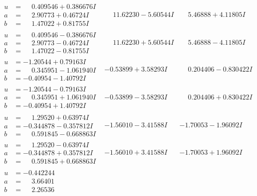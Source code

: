 \documentclass[1p]{elsarticle_modified}
\theoremstyle{definition}
\begin{document}
$$\begin{array}{c|c|c}
\begin{aligned}
u &= \phantom{-}0.409546 + 0.386676 I \\
a &= \phantom{-}2.90773 + 0.46724 I \\
b &= \phantom{-}1.47022 + 0.81755 I\end{aligned}
 & \phantom{-}11.62230 - 5.60544 I & \phantom{-}5.46888 + 4.11805 I \\ \hline\begin{aligned}
u &= \phantom{-}0.409546 - 0.386676 I \\
a &= \phantom{-}2.90773 - 0.46724 I \\
b &= \phantom{-}1.47022 - 0.81755 I\end{aligned}
 & \phantom{-}11.62230 + 5.60544 I & \phantom{-}5.46888 - 4.11805 I \\ \hline\begin{aligned}
u &= -1.20544 + 0.79163 I \\
a &= \phantom{-}0.345951 - 1.061940 I \\
b &= -0.40954 - 1.40792 I\end{aligned}
 & -0.53899 + 3.58293 I & \phantom{-}0.204406 - 0.830422 I \\ \hline\begin{aligned}
u &= -1.20544 - 0.79163 I \\
a &= \phantom{-}0.345951 + 1.061940 I \\
b &= -0.40954 + 1.40792 I\end{aligned}
 & -0.53899 - 3.58293 I & \phantom{-}0.204406 + 0.830422 I \\ \hline\begin{aligned}
u &= \phantom{-}1.29520 + 0.63974 I \\
a &= -0.344878 - 0.357812 I \\
b &= \phantom{-}0.591845 - 0.668863 I\end{aligned}
 & -1.56010 - 3.41588 I & -1.70053 - 1.96092 I \\ \hline\begin{aligned}
u &= \phantom{-}1.29520 - 0.63974 I \\
a &= -0.344878 + 0.357812 I \\
b &= \phantom{-}0.591845 + 0.668863 I\end{aligned}
 & -1.56010 + 3.41588 I & -1.70053 + 1.96092 I \\ \hline\begin{aligned}
u &= -0.442244\phantom{ +0.000000I} \\
a &= \phantom{-}3.66401\phantom{ +0.000000I} \\
b &= \phantom{-}2.26536\phantom{ +0.000000I}\end{aligned}

\end{array}$$
\end{document}
